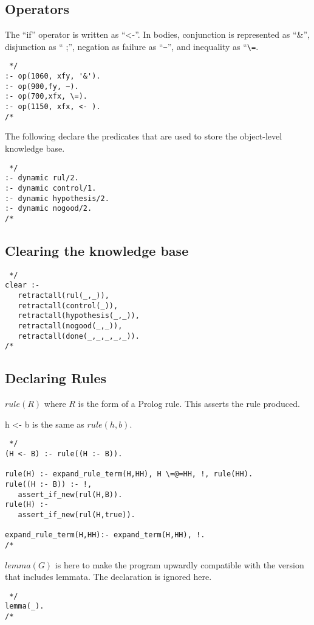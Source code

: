 \documentclass[11pt,fleqn]{article}
\begin{document}
\subsection{Operators}
The ``if'' operator is written as ``{\ttfamily <-}''.  In bodies,
conjunction is represented as ``{\ttfamily \&}'', disjunction as ``{\ttfamily
;}'', negation as failure as ``\verb|~|'', and inequality as
``\verb|\=|.
\begin{verbatim} */
:- op(1060, xfy, '&').
:- op(900,fy, ~).
:- op(700,xfx, \=).
:- op(1150, xfx, <- ).
/* \end{verbatim}
The following declare the predicates that are used to store the
object-level knowledge base.
\begin{verbatim} */
:- dynamic rul/2.
:- dynamic control/1.
:- dynamic hypothesis/2.
:- dynamic nogood/2.
/* \end{verbatim}
   
\subsection{Clearing the knowledge base}
\begin{verbatim} */
clear :-
   retractall(rul(_,_)),
   retractall(control(_)),
   retractall(hypothesis(_,_)),
   retractall(nogood(_,_)),
   retractall(done(_,_,_,_,_)).
/* \end{verbatim}

\subsection{Declaring Rules}

$rule(R)$ where $R$ is the form of a Prolog rule. This asserts the
rule produced. 

{\ttfamily h <- b} is the same as $rule(h,b)$.

\begin{verbatim} */
(H <- B) :- rule((H :- B)).

rule(H) :- expand_rule_term(H,HH), H \=@=HH, !, rule(HH).
rule((H :- B)) :- !,
   assert_if_new(rul(H,B)).
rule(H) :-
   assert_if_new(rul(H,true)).

expand_rule_term(H,HH):- expand_term(H,HH), !.
/* \end{verbatim}

$lemma(G)$ is here to make the program upwardly compatible with the
version that includes lemmata. The declaration is ignored here.

\begin{verbatim} */
lemma(_).
/* \end{verbatim}
\end{document}
